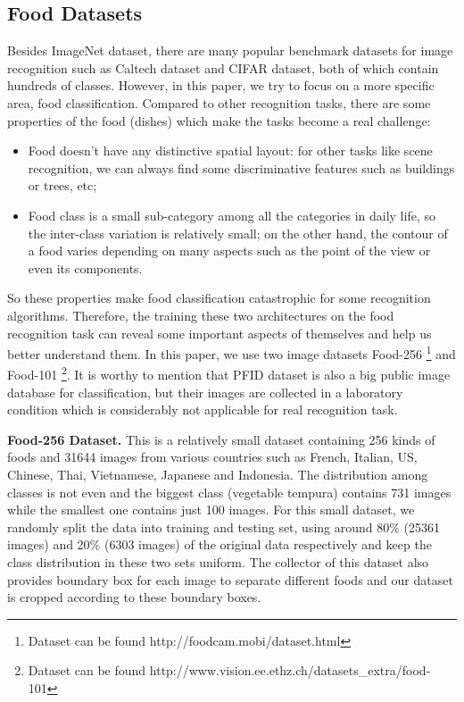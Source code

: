 \subsection{Food Datasets}
Besides ImageNet dataset, there are many popular benchmark datasets for image recognition such as Caltech dataset and CIFAR dataset, both of which contain hundreds of classes. However, in this paper, we try to focus on a more specific area, food classification. Compared to other recognition tasks, there are some properties of the food (dishes) which make the tasks become a real challenge:
\begin{itemize}
  \item Food doesn't have any distinctive spatial layout: for other tasks like scene recognition, we can always find some discriminative features such as buildings or trees, etc;
  \item Food class is a small sub-category among all the categories in daily life, so the inter-class variation is relatively small; on the other hand, the contour of a food varies depending on many aspects such as the point of the view or even its components.
\end{itemize}
So these properties make food classification catastrophic for some recognition algorithms. Therefore, the training these two architectures on the food recognition task can reveal some important aspects of themselves and help us better understand them. In this paper, we use two image datasets Food-256 \cite{kawano14c}\footnote{Dataset can be found http://foodcam.mobi/dataset.html} and Food-101 \cite{bossard14}\footnote{Dataset can be found http://www.vision.ee.ethz.ch/datasets\_extra/food-101}. It is worthy to mention that PFID dataset is also a big public image database for classification, but their images are collected in a laboratory condition which is considerably not applicable for real recognition task.

\textbf{Food-256 Dataset.}
This is a relatively small dataset containing 256 kinds of foods and 31644 images from various countries such as French, Italian, US, Chinese, Thai, Vietnamese, Japanese and Indonesia. The distribution among classes is not even and the biggest class (vegetable tempura) contains 731 images while the smallest one contains just 100 images. For this small dataset, we randomly split the data into training and testing set, using around 80\% (25361 images) and 20\% (6303 images) of the original data respectively and keep the class distribution in these two sets uniform. The collector of this dataset also provides boundary box for each image to separate different foods and our dataset is cropped according to these boundary boxes.

